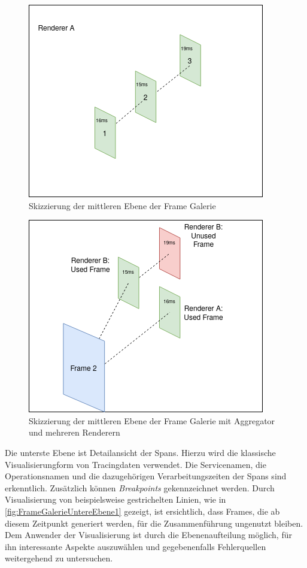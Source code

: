 \begin{figure}[]
	\centering
	\includegraphics[scale=0.8]{img/Design/FrameGalerieMittlereEbene2.png}
	\caption[Mittlere Ebene der Frame Galerie ohne Aggregator]{ Skizzierung der mittleren Ebene der Frame Galerie}
	\label{fig:FrameGalerieMittlereEbene2}
\end{figure}
\begin{figure}[]
	\centering
	\includegraphics[scale=0.8]{img/Design/FrameGalerieMittlereEbene.png}
	\caption[Mittlere Ebene der Frame Galerie mit Aggregator und mehreren Renderen]{ Skizzierung der mittleren Ebene der Frame Galerie mit Aggregator und mehreren Renderern}
	\label{fig:FrameGalerieMittlereEbene}
\end{figure}

Die unterste Ebene ist Detailansicht der Spans. Hierzu wird die klassische Visualisierungform von Tracingdaten verwendet. Die Servicenamen, die Operationsnamen und die dazugehörigen Verarbeitungszeiten der Spans sind erkenntlich. Zusätzlich können \emph{Breakpoints} gekennzeichnet werden. Durch Visualisierung von beispielsweise gestrichelten Linien, wie in \cref{fig:FrameGalerieUntereEbene1} gezeigt, ist ersichtlich, dass Frames, die ab diesem Zeitpunkt generiert werden, für die Zusammenführung ungenutzt bleiben. Dem Anwender der Visualisierung ist durch die Ebenenaufteilung möglich, für ihn interessante Aspekte auszuwählen und gegebenenfalls Fehlerquellen weitergehend zu untersuchen.

